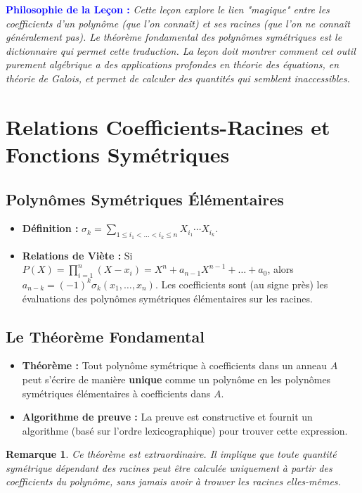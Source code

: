 \documentclass[12pt, a4paper, parskip=full]{report}
\theoremstyle{agregstyle}
\newtheorem{remark}[definition]{Remarque}
\newenvironment{philosophie}
  {\par\medskip\noindent\begin{oframed}\noindent\textbf{\textcolor{blue}{Philosophie de la Leçon :}}\itshape}
  {\end{oframed}\par\medskip}
\begin{document}
\begin{philosophie}
    Cette leçon explore le lien "magique" entre les coefficients d'un polynôme (que l'on connaît) et ses racines (que l'on ne connaît généralement pas). Le théorème fondamental des polynômes symétriques est le dictionnaire qui permet cette traduction. La leçon doit montrer comment cet outil purement algébrique a des applications profondes en théorie des équations, en théorie de Galois, et permet de calculer des quantités qui semblent inaccessibles.
\end{philosophie}

\section{Relations Coefficients-Racines et Fonctions Symétriques}
\subsection{Polynômes Symétriques Élémentaires}
\begin{itemize}
    \item \textbf{Définition :} $\sigma_k = \sum_{1 \le i_1 < \dots < i_k \le n} X_{i_1} \cdots X_{i_k}$.
    \item \textbf{Relations de Viète :} Si $P(X) = \prod_{i=1}^n (X-x_i) = X^n + a_{n-1}X^{n-1} + \dots + a_0$, alors $a_{n-k} = (-1)^k \sigma_k(x_1, \dots, x_n)$. Les coefficients sont (au signe près) les évaluations des polynômes symétriques élémentaires sur les racines.
\end{itemize}
\subsection{Le Théorème Fondamental}
\begin{itemize}
    \item \textbf{Théorème :} Tout polynôme symétrique à coefficients dans un anneau $A$ peut s'écrire de manière \textbf{unique} comme un polynôme en les polynômes symétriques élémentaires à coefficients dans $A$.
    \item \textbf{Algorithme de preuve :} La preuve est constructive et fournit un algorithme (basé sur l'ordre lexicographique) pour trouver cette expression.
\end{itemize}
\begin{remark}
    Ce théorème est extraordinaire. Il implique que toute quantité symétrique dépendant des racines peut être calculée \textit{uniquement} à partir des coefficients du polynôme, sans jamais avoir à trouver les racines elles-mêmes.
\end{remark}
\end{document}
